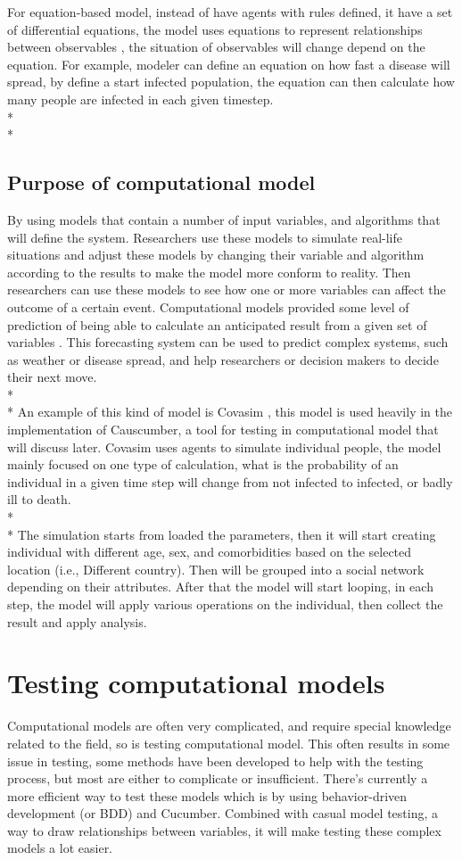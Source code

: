 For equation-based model, instead of have agents with rules defined, it have a set of differential equations, the model uses equations to represent relationships between observables \cite{Reference7}, the situation of observables will change depend on the equation. For example, modeler can define an equation on how fast a disease will spread, by define a start infected population, the equation can then calculate how many people are infected in each given timestep. \\*\\*

\subsection{Purpose of computational model}
By using models that contain a number of input variables, and algorithms that will define the system. Researchers use these models to simulate real-life situations and adjust these models by changing their variable and algorithm according to the results to make the model more conform to reality. Then researchers can use these models to see how one or more variables can affect the outcome of a certain event. Computational models provided some level of prediction of being able to calculate an anticipated result from a given set of variables \cite{Reference8}. This forecasting system can be used to predict complex systems, such as weather or disease spread, and help researchers or decision makers to decide their next move.\\*\\*
An example of this kind of model is Covasim \cite{Reference9}, this model is used heavily in the implementation of Causcumber, a tool for testing in computational model that will discuss later. Covasim uses agents to simulate individual people, the model mainly focused on one type of calculation, what is the probability of an individual in a given time step will change from not infected to infected, or badly ill to death. \\*\\*
The simulation starts from loaded the parameters, then it will start creating individual with different age, sex, and comorbidities based on the selected location (i.e., Different country). Then will be grouped into a social network depending on their attributes. After that the model will start looping, in each step, the model will apply various operations on the individual, then collect the result and apply analysis.

\section{Testing computational models}
Computational models are often very complicated, and require special knowledge related to the field, so is testing computational model. This often results in some issue in testing, some methods have been developed to help with the testing process, but most are either to complicate or insufficient. There’s currently a more efficient way to test these models which is by using behavior-driven development (or BDD) and Cucumber. Combined with casual model testing, a way to draw relationships between variables, it will make testing these complex models a lot easier.

